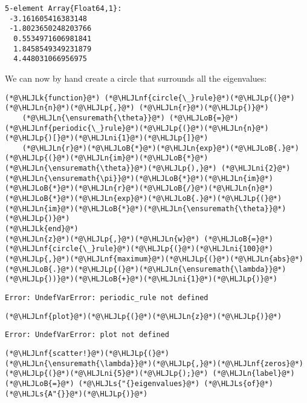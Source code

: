 \documentclass[12pt,a4paper]{article}
\newcommand{\HLJLk}[1]{\textcolor[RGB]{148,91,176}{\textbf{#1}}}
\newcommand{\HLJLn}[1]{#1}
\newcommand{\HLJLnf}[1]{\textcolor[RGB]{66,102,213}{#1}}
\newcommand{\HLJLs}[1]{\textcolor[RGB]{201,61,57}{#1}}
\newcommand{\HLJLni}[1]{\textcolor[RGB]{59,151,46}{#1}}
\newcommand{\HLJLoB}[1]{\textcolor[RGB]{102,102,102}{\textbf{#1}}}
\newcommand{\HLJLp}[1]{#1}
\begin{document}
\begin{lstlisting}
5-element Array{Float64,1}:
 -3.161605416383148 
 -1.8023650248203766
  0.5534971606981841
  1.8458549349231879
  4.448031066956975
\end{lstlisting}


We can now by hand create a circle that surrounds all the eigenvalues:


\begin{lstlisting}
(*@\HLJLk{function}@*) (*@\HLJLnf{circle{\_}rule}@*)(*@\HLJLp{(}@*)(*@\HLJLn{n}@*)(*@\HLJLp{,}@*) (*@\HLJLn{r}@*)(*@\HLJLp{)}@*) 
    (*@\HLJLn{\ensuremath{\theta}}@*) (*@\HLJLoB{=}@*) (*@\HLJLnf{periodic{\_}rule}@*)(*@\HLJLp{(}@*)(*@\HLJLn{n}@*)(*@\HLJLp{)[}@*)(*@\HLJLni{1}@*)(*@\HLJLp{]}@*)
    (*@\HLJLn{r}@*)(*@\HLJLoB{*}@*)(*@\HLJLn{exp}@*)(*@\HLJLoB{.}@*)(*@\HLJLp{(}@*)(*@\HLJLn{im}@*)(*@\HLJLoB{*}@*)(*@\HLJLn{\ensuremath{\theta}}@*)(*@\HLJLp{),}@*) (*@\HLJLni{2}@*)(*@\HLJLn{\ensuremath{\pi}}@*)(*@\HLJLoB{*}@*)(*@\HLJLn{im}@*)(*@\HLJLoB{*}@*)(*@\HLJLn{r}@*)(*@\HLJLoB{/}@*)(*@\HLJLn{n}@*)(*@\HLJLoB{*}@*)(*@\HLJLn{exp}@*)(*@\HLJLoB{.}@*)(*@\HLJLp{(}@*)(*@\HLJLn{im}@*)(*@\HLJLoB{*}@*)(*@\HLJLn{\ensuremath{\theta}}@*)(*@\HLJLp{)}@*)
(*@\HLJLk{end}@*)
(*@\HLJLn{z}@*)(*@\HLJLp{,}@*)(*@\HLJLn{w}@*) (*@\HLJLoB{=}@*) (*@\HLJLnf{circle{\_}rule}@*)(*@\HLJLp{(}@*)(*@\HLJLni{100}@*)(*@\HLJLp{,}@*)(*@\HLJLnf{maximum}@*)(*@\HLJLp{(}@*)(*@\HLJLn{abs}@*)(*@\HLJLoB{.}@*)(*@\HLJLp{(}@*)(*@\HLJLn{\ensuremath{\lambda}}@*)(*@\HLJLp{))}@*)(*@\HLJLoB{+}@*)(*@\HLJLni{1}@*)(*@\HLJLp{)}@*)
\end{lstlisting}

\begin{lstlisting}
Error: UndefVarError: periodic_rule not defined
\end{lstlisting}


\begin{lstlisting}
(*@\HLJLnf{plot}@*)(*@\HLJLp{(}@*)(*@\HLJLn{z}@*)(*@\HLJLp{)}@*)
\end{lstlisting}

\begin{lstlisting}
Error: UndefVarError: plot not defined
\end{lstlisting}


\begin{lstlisting}
(*@\HLJLnf{scatter!}@*)(*@\HLJLp{(}@*)(*@\HLJLn{\ensuremath{\lambda}}@*)(*@\HLJLp{,}@*)(*@\HLJLnf{zeros}@*)(*@\HLJLp{(}@*)(*@\HLJLni{5}@*)(*@\HLJLp{);}@*) (*@\HLJLn{label}@*) (*@\HLJLoB{=}@*) (*@\HLJLs{"{}eigenvalues}@*) (*@\HLJLs{of}@*) (*@\HLJLs{A"{}}@*)(*@\HLJLp{)}@*)
\end{lstlisting}
\end{document}
